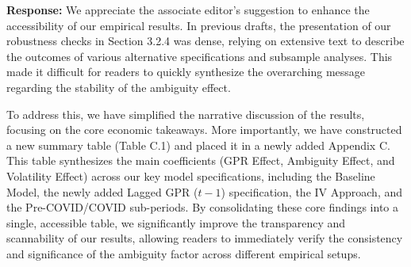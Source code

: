 \documentclass[12pt]{article}
\begin{document}
\begin{highlightbox}
\textbf{Response:} We appreciate the associate editor's suggestion to enhance the accessibility of our empirical results. In previous drafts, the presentation of our robustness checks in Section 3.2.4 was dense, relying on extensive text to describe the outcomes of various alternative specifications and subsample analyses. This made it difficult for readers to quickly synthesize the overarching message regarding the stability of the ambiguity effect.

To address this, we have simplified the narrative discussion of the results, focusing on the core economic takeaways. More importantly, we have constructed a new summary table (Table C.1) and placed it in a newly added Appendix C. This table synthesizes the main coefficients (GPR Effect, Ambiguity Effect, and Volatility Effect) across our key model specifications, including the Baseline Model, the newly added Lagged GPR ($t-1$) specification, the IV Approach, and the Pre-COVID/COVID sub-periods. By consolidating these core findings into a single, accessible table, we significantly improve the transparency and scannability of our results, allowing readers to immediately verify the consistency and significance of the ambiguity factor across different empirical setups.
\end{highlightbox}
\end{document}
